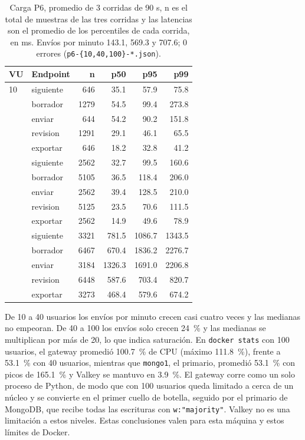 \documentclass[conference]{IEEEtran}
\begin{document}
\begin{table}[!t]
\caption{Carga P6, promedio de 3 corridas de 90 s, n es el total de muestras de las tres corridas y las latencias son el promedio de los percentiles de cada corrida, en ms. Envíos por minuto 143.1, 569.3 y 707.6; 0 errores (\texttt{p6-\{10,40,100\}-*.json}).}
\label{tab:carga}
\centering\scriptsize
\begin{tabular}{@{}l l r r r r@{}}
\toprule
\textbf{VU} & \textbf{Endpoint} & \textbf{n} & \textbf{p50} & \textbf{p95} & \textbf{p99} \\
\midrule
10 & siguiente & 646 & 35.1 & 57.9 & 75.8 \\
 & borrador & 1279 & 54.5 & 99.4 & 273.8 \\
 & enviar & 644 & 54.2 & 90.2 & 151.8 \\
 & revision & 1291 & 29.1 & 46.1 & 65.5 \\
 & exportar & 646 & 18.2 & 32.8 & 41.2 \\
\addlinespace
40 & siguiente & 2562 & 32.7 & 99.5 & 160.6 \\
 & borrador & 5105 & 36.5 & 118.4 & 206.0 \\
 & enviar & 2562 & 39.4 & 128.5 & 210.0 \\
 & revision & 5125 & 23.5 & 70.6 & 111.5 \\
 & exportar & 2562 & 14.9 & 49.6 & 78.9 \\
\addlinespace
100 & siguiente & 3321 & 781.5 & 1086.7 & 1343.5 \\
 & borrador & 6467 & 670.4 & 1836.2 & 2276.7 \\
 & enviar & 3184 & 1326.3 & 1691.0 & 2206.8 \\
 & revision & 6448 & 587.6 & 703.4 & 820.7 \\
 & exportar & 3273 & 468.4 & 579.6 & 674.2 \\
\bottomrule
\end{tabular}
\end{table}

De 10 a 40 usuarios los envíos por minuto crecen casi cuatro veces y las medianas no empeoran. De 40 a 100 los envíos solo crecen 24~\% y las medianas se multiplican por más de 20, lo que indica saturación. En \texttt{docker stats} con 100 usuarios, el gateway promedió 100.7~\% de CPU (máximo 111.8~\%), frente a 53.1~\% con 40 usuarios, mientras que \texttt{mongo1}, el primario, promedió 53.1~\% con picos de 165.1~\% y Valkey se mantuvo en 3.9~\%. El gateway corre como un solo proceso de Python, de modo que con 100 usuarios queda limitado a cerca de un núcleo y se convierte en el primer cuello de botella, seguido por el primario de MongoDB, que recibe todas las escrituras con \texttt{w:"majority"}. Valkey no es una limitación a estos niveles. Estas conclusiones valen para esta máquina y estos límites de Docker.
\end{document}
